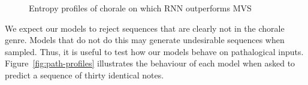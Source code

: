 \documentclass[12pt,a4paper,twoside,openright]{report}
\begin{document}
\begin{figure}[H]
\centering
{}

\caption{Entropy profiles of chorale on which RNN outperforms MVS}
\label{fig:als-der-profiles}
\end{figure}

We expect our models to reject sequences that are clearly not in the chorale
genre. Models that do not do this may generate undesirable sequences when
sampled. Thus, it is useful to test how our models behave on pathalogical
inputs. Figure~\ref{fig:path-profiles} illustrates the behaviour of each model
when asked to predict a sequence of thirty identical notes. 
\end{document}

